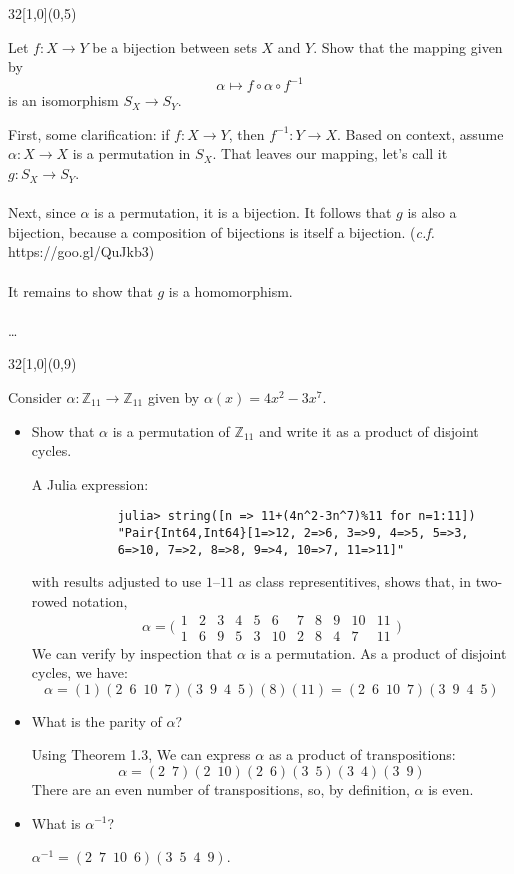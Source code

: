 \documentclass[12pt]{article}
\newcommand{\zee}{\mathbb{Z}}
\newenvironment{exercise}[2]{\begin{textblock}{32}[1,0](0,#2)\noindent#1\end{textblock}}{\vspace{1in}}
\begin{document}
\begin{exercise}{1.39}{5}
	{\noindent}Let $f : X\to Y$ be a bijection between sets $X$ and $Y$. Show that the mapping given by \[\alpha \mapsto f\circ\alpha\circ f^{-1}\] is an isomorphism $S_X\to S_Y$.
	\bigskip

	{\noindent}First, some clarification: if $f:X\to Y$, then $f^{-1}:Y\to X$. Based on context, assume $\alpha:X\to X$ is a permutation in $S_X$.
	That leaves our mapping, let's call it $g:S_X\to S_Y$.\\
	\\
	Next, since $\alpha$ is a permutation, it is a bijection. It follows that $g$ is also a bijection, because a composition of bijections is itself a bijection. ({\small{\textit{c.f.} https://goo.gl/QuJkb3}})\\
	\\
	It remains to show that $g$ is a homomorphism.\\
	\\
	\dots
\end{exercise}

\newpage

\begin{exercise}{1.29}{9}
	{\noindent}Consider $\alpha: \zee_{11}\to \zee_{11}$ given by $\alpha(x)=4x^2-3x^7$.
	\begin{itemize}
		\item Show that $\alpha$ is a permutation of $\zee_{11}$ and write it as a product of disjoint cycles.
		\bigskip

		A Julia expression:
		\begin{verbatim}
			julia> string([n => 11+(4n^2-3n^7)%11 for n=1:11])
			"Pair{Int64,Int64}[1=>12, 2=>6, 3=>9, 4=>5, 5=>3,
			6=>10, 7=>2, 8=>8, 9=>4, 10=>7, 11=>11]"
		\end{verbatim}
		with results adjusted to use $1$--$11$ as class representitives, shows that, in two-rowed notation,
		\[
		\alpha = \bigl(
			\begin{array}{rrrrrrrrrrr}
		    1 &  2 &  3 &  4 &  5 &  6 &  7 &  8 &  9 & 10 & 11 \\
		    1 &  6 &  9 &  5 &  3 & 10 &  2 &  8 &  4 &  7 & 11
		  \end{array}
			\bigr)
		\]
		We can verify by inspection that $\alpha$ is a permutation. As a product of disjoint cycles, we have:
		\[ \alpha = (1)(2\enspace6\enspace10\enspace7)(3\enspace9\enspace4\enspace5)(8)(11) = (2\enspace6\enspace10\enspace7)(3\enspace9\enspace4\enspace5) \]

		\item What is the parity of $\alpha$?
		\bigskip

		Using Theorem 1.3, We can express $\alpha$ as a product of transpositions:
		\[ \alpha = (2\enspace7)(2\enspace10)(2\enspace6)(3\enspace5)(3\enspace4)(3\enspace9) \]
		There are an even number of transpositions, so, by definition, $\alpha$ is even.

		\item What is $\alpha^{-1}$?
		\bigskip

		$\alpha^{-1}=(2\enspace7\enspace10\enspace6)(3\enspace5\enspace4\enspace9)$.
	\end{itemize}
\end{exercise}
\end{document}
